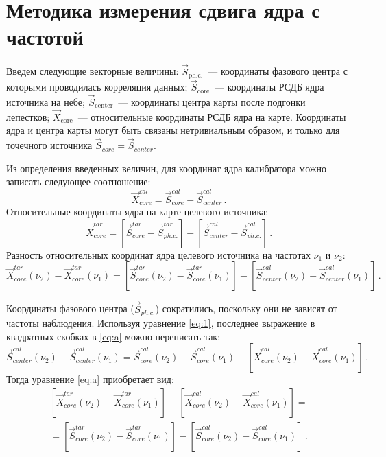 \section{Методика измерения сдвига ядра с частотой}

Введем следующие векторные величины: $\vec{S}_\text{ph.c.}$~--- координаты фазового центра с
которыми проводилась корреляция данных; $\vec{S}_\text{core}$~--- координаты РСДБ ядра источника
на небе; $\vec{S}_\text{center}$~--- координаты центра карты после подгонки лепестков;
$\vec{X}_\text{core}$~--- относительные координаты РСДБ ядра на карте. Координаты ядра и центра
карты могут быть связаны нетривиальным образом, и только для точечного источника
$\vec{S}_{core} = \vec{S}_{center}$.

Из определения введенных величин, для координат ядра калибратора можно записать следующее
соотношение:
\begin{equation}
 \label{eq:1}
 \vec{X}_{core}^{cal} = \vec{S}_{core}^{cal} - \vec{S}_{center}^{cal} \,\text{.}
\end{equation}
Относительные координаты ядра на карте целевого источника:
\begin{equation}
 \vec{X}_{core}^{tar} = [\vec{S}_{core}^{tar} - \vec{S}_{ph.c.}^{tar}] -
 [\vec{S}_{center}^{cal} - \vec{S}_{ph.c.}^{cal}] \,\text{.}
\end{equation}
Разность относительных координат ядра целевого источника на частотах $\nu_1$ и $\nu_2$:
\begin{equation}
 \label{eq:a}
 \vec{X}_{core}^{tar}(\nu_2) - \vec{X}_{core}^{tar}(\nu_1) =
 [\vec{S}_{core}^{tar}(\nu_2) - \vec{S}_{core}^{tar}(\nu_1)] -
 [\vec{S}_{center}^{cal}(\nu_2) - \vec{S}_{center}^{cal}(\nu_1)] \,\text{.}
\end{equation}

Координаты фазового центра ($\vec{S}_{ph.c.}$) сократились, поскольку они не зависят от частоты
наблюдения. Используя уравнение \eqref{eq:1}, последнее выражение в квадратных скобках в
\eqref{eq:a} можно переписать так:
\begin{equation}
 \vec{S}_{center}^{cal}(\nu_2) - \vec{S}_{center}^{cal}(\nu_1) =
 \vec{S}_{core}^{cal}(\nu_2) - \vec{S}_{core}^{cal}(\nu_1) -
 [\vec{X}_{core}^{cal}(\nu_2) - \vec{X}_{core}^{cal}(\nu_1)] \,\text{.}
\end{equation}
Тогда уравнение \eqref{eq:a} приобретает вид:
\begin{multline}
 \label{eq:b}
 [\vec{X}_{core}^{tar}(\nu_2) - \vec{X}_{core}^{tar}(\nu_1)] -
 [\vec{X}_{core}^{cal}(\nu_2) - \vec{X}_{core}^{cal}(\nu_1)] =\\
 = [\vec{S}_{core}^{tar}(\nu_2) - \vec{S}_{core}^{tar}(\nu_1)] -
 [\vec{S}_{core}^{cal}(\nu_2) - \vec{S}_{core}^{cal}(\nu_1)] \,\text{.}
\end{multline}

